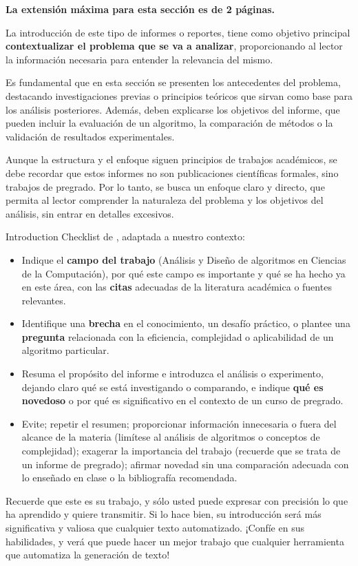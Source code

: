 \begin{mdframed}
    \textbf{La extensión máxima para esta sección es de 2 páginas.}
\end{mdframed}

La introducción de este tipo de informes o reportes, tiene como objetivo principal \textbf{contextualizar el problema que se va a analizar}, proporcionando al lector la información necesaria para entender la relevancia del mismo. 

Es fundamental que en esta sección se presenten los antecedentes del problema, destacando investigaciones previas o principios teóricos que sirvan como base para los análisis posteriores. Además, deben explicarse los objetivos del informe, que pueden incluir la evaluación de un algoritmo, la comparación de métodos o la validación de resultados experimentales.

Aunque la estructura y el enfoque siguen principios de trabajos académicos, se debe recordar que estos informes no son publicaciones científicas formales, sino trabajos de pregrado. Por lo tanto, se busca un enfoque claro y directo, que permita al lector comprender la naturaleza del problema y los objetivos del análisis, sin entrar en detalles excesivos. 


Introduction Checklist de  \cite{GoodScientificPaper}, adaptada a nuestro contexto:

\begin{itemize}
\item Indique el \textbf{campo del trabajo} (Análisis y Diseño de algoritmos en Ciencias de la Computación), por qué este campo es importante y qué se ha hecho ya en este área, con las \textbf{citas} adecuadas de la literatura académica o fuentes relevantes.
\item Identifique una \textbf{brecha} en el conocimiento, un desafío práctico, o plantee una \textbf{pregunta} relacionada con la eficiencia, complejidad o aplicabilidad de un algoritmo particular.
\item Resuma el propósito del informe e introduzca el análisis o experimento, dejando claro qué se está investigando o comparando, e indique \textbf{qué es novedoso} o por qué es significativo en el contexto de un curso de pregrado.
\item Evite; repetir el resumen; proporcionar información innecesaria o fuera del alcance de la materia (limítese al análisis de algoritmos o conceptos de complejidad); exagerar la importancia del trabajo (recuerde que se trata de un informe de pregrado); afirmar novedad sin una comparación adecuada con lo enseñado en clase o la bibliografía recomendada.
\end{itemize}



\begin{mdframed}
Recuerde que este es su trabajo, y sólo usted puede expresar con precisión lo que ha aprendido y quiere transmitir. Si lo hace bien, su introducción será más significativa y valiosa que cualquier texto automatizado. ¡Confíe en sus habilidades, y verá que puede hacer un mejor trabajo que cualquier herramienta que automatiza la generación de texto!
\end{mdframed}

